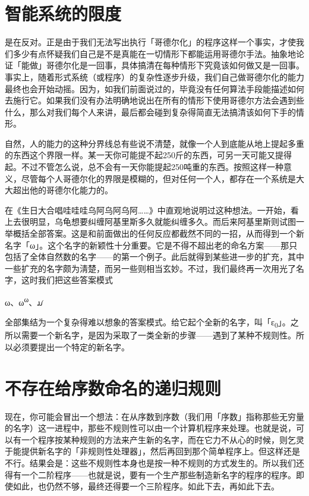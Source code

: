 \documentclass[
  12pt,
  twoside,
  openright,
  oldfontcommands,
]{memoir}
\begin{document}
\section{智能系统的限度}

是在反对。正是由于我们无法写出执行「哥德尔化」的程序这样一个事实，才使我们多少有点怀疑我们自己是不是真能在一切情形下都能运用哥德尔手法。抽象地论证「能做」哥德尔化是一回事，具体搞清在每种情形下究竟该如何做又是一回事。事实上，随着形式系统（或程序）的复杂性逐步升级，我们自己做哥德尔化的能力最终也会开始动摇。因为，如我们前面说过的，毕竟没有任何算法手段能描述如何去施行它。如果我们没有办法明确地说出在所有的情形下使用哥德尔方法会遇到些什么，那么对我们每个人来讲，最后都会碰到复杂得简直无法搞清该如何下手的情形。

自然，人的能力的这种分界线总有些说不清楚，就像一个人到底能从地上提起多重的东西这个界限一样。某一天你可能提不起250斤的东西，可另一天可能又提得起。不过不管怎么说，总不会有一天你能提起250吨重的东西。按照这样一种意义，尽管每个人哥德尔化的界限是模糊的，但对任何一个人，都存在一个系统是大大超出他的哥德尔化能力的。

在《生日大合唱哇哇哇乌阿乌阿乌阿\ldots\ldots》中直观地说明过这种想法。一开始，看上去很明显，乌龟想要纠缠阿基里斯多久就能纠缠多久。而后来阿基里斯则试图一举概括全部答案。这是和前面做出的任何反应都截然不同的一招，从而得到一个新名字「ω」。这个名字的新颖性十分重要。它是不得不超出老的命名方案------那只包括了全体自然数的名字------的第一个例子。此后就得到某些进一步的扩充，其中一些扩充的名字颇为淸楚，而另一些则相当玄妙。不过，我们最终再一次用光了名字，这时我们把这些答案模式

ω、ω\textsuperscript{ω}、{\gebfont ꪣ}

全部集结为一个复杂得难以想象的答案模式。给它起个全新的名字，叫「ε\textsubscript{0}」。之所以需要一个新名字，是因为采取了一类全新的步骤------遇到了某种不规则性。所以必须要提出一个特定的新名字。

\section{不存在给序数命名的递归规则}

现在，你可能会冒出一个想法：在从序数到序数（我们用「序数」指称那些无穷量的名字）这一进程中，那些不规则性可以由一个计算机程序来处理。也就是说，可以有一个程序按某种规则的方法来产生新的名字，而在它力不从心的时候，则乞灵于能提供新名字的「非规则性处理器」，然后再回到那个简单程序上。但这样还是不行。结果会是：这些不规则性本身也是按一种不规则的方式发生的。所以我们还得有一个二阶程序------也就是说，要有一个生产那些制造新名字的程序的程序。即使如此，也仍然不够，最终还得要一个三阶程序。如此下去，再如此下去。
\end{document}
